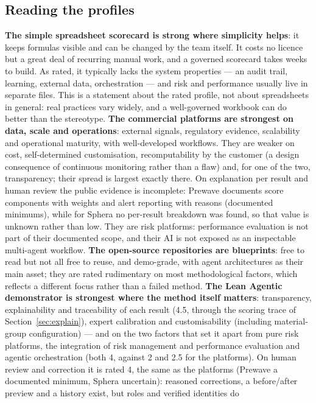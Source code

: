 \documentclass[10pt,twocolumn,a4paper]{article}
\begin{document}
\subsection{Reading the profiles}
\textbf{The simple spreadsheet scorecard is strong where simplicity helps}: it keeps
formulas visible and can be changed by the team itself. It costs no licence but a great
deal of recurring manual work, and a governed scorecard takes weeks to build. As rated, it
typically lacks the system properties --- an audit trail, learning, external data,
orchestration --- and risk and performance usually live in separate files. This is a
statement about the rated profile, not about spreadsheets in general: real practices vary
widely, and a well-governed workbook can do better than the stereotype.
\textbf{The commercial platforms are strongest on data, scale and operations}: external
signals, regulatory evidence, scalability and operational maturity, with well-developed
workflows. They are weaker on cost, self-determined customisation, recomputability by the
customer (a design consequence of continuous monitoring rather than a flaw) and, for one
of the two, transparency; their spread is largest exactly there. On explanation per result
and human review the public evidence is incomplete: Prewave documents score components with
weights and alert reporting with reasons (documented minimums), while for Sphera no per-result
breakdown was found, so that value is unknown rather than low. They are risk
platforms: performance evaluation is not part of their documented scope, and their AI is
not exposed as an inspectable multi-agent workflow.
\textbf{The open-source repositories are blueprints}: free to read but not all free to reuse, and demo-grade,
with agent architectures as their main asset; they are rated rudimentary on most
methodological factors, which reflects a different focus rather than a failed method.
\textbf{The Lean Agentic demonstrator is strongest where the method itself matters}:
transparency, explainability and traceability of each result (4.5, through the scoring trace
of Section~\ref{sec:explain}), expert calibration and customisability (including
material-group configuration) --- and on the two factors that set it apart from pure risk platforms,
the integration of risk management and performance evaluation and agentic orchestration
(both 4, against 2 and 2.5 for the platforms). On human review and correction it is rated
4, the same as the platforms (Prewave a documented minimum, Sphera uncertain): reasoned
corrections, a before/after preview and a history exist, but roles and verified identities do
\end{document}

